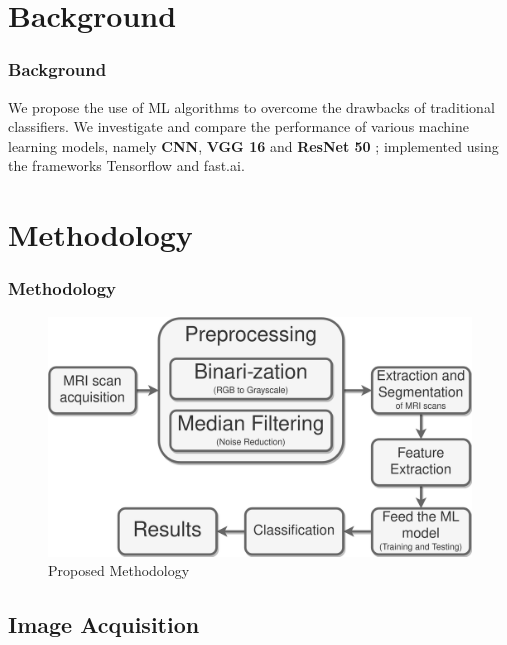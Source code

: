 \documentclass[10pt, aspectratio=169]{beamer}
\begin{document}
	\section{Background}

	\begin{frame}
		\frametitle{Background}

		We propose the use of ML algorithms to overcome the drawbacks of
		traditional classifiers. We investigate and compare the performance of
		various machine learning models, namely \textbf{CNN}, \textbf{VGG 16}
		and \textbf{ ResNet 50 }; implemented using the frameworks Tensorflow
		and fast.ai.
	\end{frame}

	\section{Methodology}

	\begin{frame}
		\frametitle{Methodology}

		\begin{figure}[h]
			\centering
			\includegraphics[width=0.7\linewidth]{imgs/methodology}
			\caption{Proposed Methodology}%
			\label{fig:prop_methodology}
		\end{figure}

	\end{frame}

	\subsection{Image Acquisition}
\end{document}
